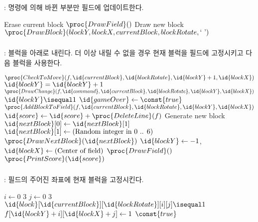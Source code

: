 \subsubsection{}: 명령에 의해 바뀐 부분만 필드에 업데이트한다.

\begin{codebox}
\li \Comment Erase current block
\li $\proc{DrawField}()$
\li \Comment Draw new block
\li $\proc{DrawBlock}(blockY, blockX, currentBlock, blockRotate, \mbox{` '})$
\end{codebox}

\newpage

\subsubsection{}: 블럭을 아래로 내린다. 더 이상 내릴 수 없을 경우 현재 블럭을 필드에 고정시키고 다음 블럭을 사용한다.

\begin{codebox}
\li \If $\proc{CheckToMove}(f, \id{currentBlock}, \id{blockRotate}, \id{blockY} + 1, \id{blockX})$
\li \Then
        $\id{blockY} = \id{blockY} + 1$
\li     $\proc{DrawChange}(f, \id{command}, \id{currentBlock}, \id{blockRotate}, \id{blockY}, \id{blockX})$
\li \Else
\li     \If $\id{blockY} \isequal 1$
\li     \Then
            $\id{gameOver} \gets \const{true}$
\li     \Else
\li         $\proc{AddBlockToField}(f, \id{currentBlock}, \id{blockRotate}, \id{blockY}, \id{blockX})$
\li         $\id{score} \gets \id{score} + \proc{DeleteLine}(f)$
\li         \Comment Generate new block
\li         $\id{nextBlock}[0] \gets \id{nextBlock}[1]$
\li         $\id{nextBlock}[1] \gets (\mbox{Random integer in 0 .. 6})$
\li         $\proc{DrawNextBlock}(\id{nextBlock})$
\li         $\id{blockY} \gets -1$, $\id{blockX} \gets (\mbox{Center of field})$
\li         $\proc{DrawField}()$
\li         $\proc{PrintScore}(\id{score})$
        \End
    \End
\end{codebox}

\subsubsection{}: 필드의 주어진 좌표에 현재 블럭을 고정시킨다.

\begin{codebox}
\li \For $i \gets 0$ \To $3$
\li \Do
        \For $j \gets 0$ \To $3$
\li     \Do
            \If $\id{block}[\id{currentBlock}][\id{blockRotate}][i][j] \isequal 1$
\li         \Then
                $f[\id{blockY} + i][\id{blockX} + j] \gets 1$
            \End
        \End
    \End
\li \Return $\const{true}$
\end{codebox}

